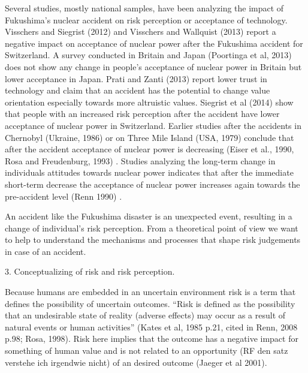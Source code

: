 Several studies, mostly national samples, have been analyzing the impact of Fukushima's nuclear accident on risk perception or acceptance of technology. Visschers and Siegrist (2012) and Visschers and Wallquist (2013) \citep{Visschers:2012bf,Visschers:2013ee}  report a negative impact on acceptance of nuclear power after the Fukushima accident for Switzerland. A survey conducted in Britain and Japan (Poortinga et al, 2013) \citep{Poortinga:2013gt} does not show any change in people's acceptance of nuclear power in Britain but lower acceptance in Japan. Prati and Zanti (2013) \citep{Prati:2013jc} report lower trust in technology and claim that an accident has the potential to change value orientation especially towards more altruistic values.
Siegrist et al (2014) \citep{Siegrist:2014ji} show that people with an increased risk perception after the accident have lower acceptance of nuclear power in Switzerland. 
Earlier studies after the accidents in Chernobyl (Ukraine, 1986) or on Three Mile Island (USA, 1979) conclude that after the accident acceptance of nuclear power is decreasing (Eiser et al., 1990, Rosa and Freudenburg, 1993) \citep{RichardEiser:1990iw, Rosa:1993uj}. Studies analyzing the long-term change in individuals attitudes towards nuclear power indicates that after the immediate short-term decrease the acceptance of nuclear power increases again towards the pre-accident level (Renn 1990) \citep{Renn:1990kf}.  


An accident like the Fukushima disaster is an unexpected event, resulting in a change of individual's risk perception. From a theoretical point of view we want to help to understand the mechanisms and processes that shape risk judgements in case of an accident. 



                                                       

 
3. Conceptualizing of risk and risk perception. 

Because  humans are embedded in an uncertain environment risk is a term that defines the possibility of  uncertain outcomes.  ``Risk is defined as the possibility that an undesirable state of reality (adverse effects) may occur as a result of natural events or human activities'' (Kates et al, 1985 p.21, cited in Renn, 2008 p.98; Rosa, 1998). Risk here implies that the outcome has a negative impact for something of human value and is not related to an opportunity (RF den satz verstehe ich irgendwie nicht) of an desired outcome (Jaeger et al 2001).


